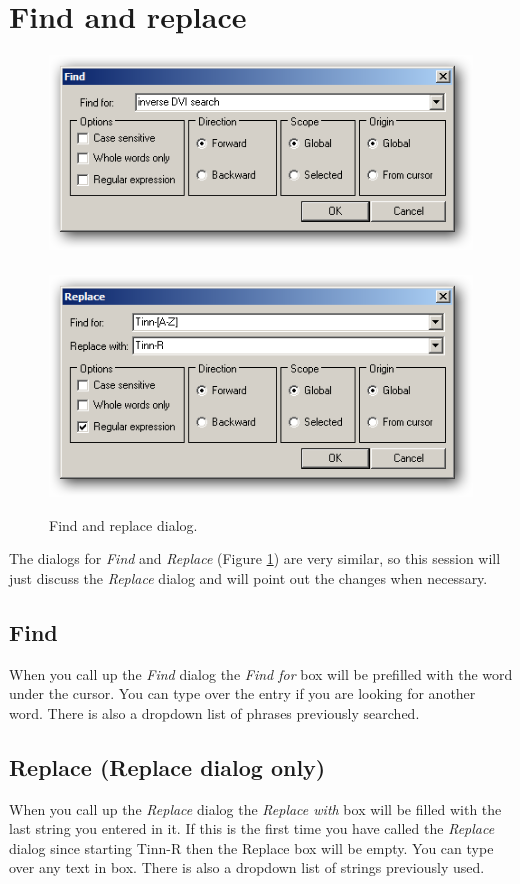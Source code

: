 
\hypertarget{working_findreplace}{}
\section{Find and replace}

\begin{figure}[h!]
  \includegraphics[scale=0.35]{./res/find.png}~~
  \includegraphics[scale=0.35]{./res/replace.png}\\
  \caption{Find and replace dialog.}
  \label{fig:find_replace}
\end{figure}

The dialogs for \textit{Find}
and \textit{Replace}
(Figure \ref{fig:find_replace})
are very similar, so this session will just discuss the \textit{Replace} dialog
and will point out the changes when necessary.


\subsection{Find}
When you call up the \textit{Find} dialog
the \textit{Find for} box will be
prefilled with the word under the cursor. You can type over the entry if you
are looking for another word. There is also a dropdown list of phrases
previously searched.


\subsection{Replace (Replace dialog only)}
When you call up the \textit{Replace} dialog
the \textit{Replace with} box
will be filled with the last string you entered in it. If this is the first
time you have called the \textit{Replace} dialog since starting Tinn-R then
the Replace box will be empty. You can type over any text in box. There is
also a dropdown list of strings previously used.


